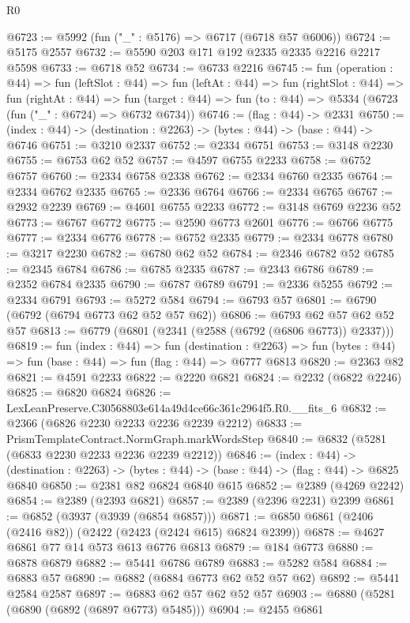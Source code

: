 \begin{lexlean}{R0}
\begin{coremodule}
@6723 := @5992 (fun ("_" : @5176) => @6717 (@6718 @57 @6006))
@6724 := @5175 @2557
@6732 := @5590 @203 @171 @192 @2335 @2335 @2216 @2217 @5598
@6733 := @6718 @52
@6734 := @6733 @2216
@6745 := fun (operation : @44) =>
  fun (leftSlot : @44) =>
  fun (leftAt : @44) =>
  fun (rightSlot : @44) =>
  fun (rightAt : @44) =>
  fun (target : @44) => fun (to : @44) => @5334 (@6723 (fun ("_" : @6724) => @6732 @6734))
@6746 := (flag : @44) -> @2331
@6750 := (index : @44) -> (destination : @2263) -> (bytes : @44) -> (base : @44) -> @6746
@6751 := @3210 @2337
@6752 := @2334 @6751
@6753 := @3148 @2230
@6755 := @6753 @62 @52
@6757 := @4597 @6755 @2233
@6758 := @6752 @6757
@6760 := @2334 @6758 @2338
@6762 := @2334 @6760 @2335
@6764 := @2334 @6762 @2335
@6765 := @2336 @6764
@6766 := @2334 @6765
@6767 := @2932 @2239
@6769 := @4601 @6755 @2233
@6772 := @3148 @6769 @2236 @52
@6773 := @6767 @6772
@6775 := @2590 @6773 @2601
@6776 := @6766 @6775
@6777 := @2334 @6776
@6778 := @6752 @2335
@6779 := @2334 @6778
@6780 := @3217 @2230
@6782 := @6780 @62 @52
@6784 := @2346 @6782 @52
@6785 := @2345 @6784
@6786 := @6785 @2335
@6787 := @2343 @6786
@6789 := @2352 @6784 @2335
@6790 := @6787 @6789
@6791 := @2336 @5255
@6792 := @2334 @6791
@6793 := @5272 @584
@6794 := @6793 @57
@6801 := @6790 (@6792 (@6794 @6773 @62 @52 @57 @62))
@6806 := @6793 @62 @57 @62 @52 @57
@6813 := @6779 (@6801 (@2341 (@2588 (@6792 (@6806 @6773)) @2337)))
@6819 := fun (index : @44) =>
  fun (destination : @2263) =>
  fun (bytes : @44) => fun (base : @44) => fun (flag : @44) => @6777 @6813
@6820 := @2363 @82
@6821 := @4591 @2233
@6822 := @2220 @6821
@6824 := @2232 (@6822 @2246)
@6825 := @6820 @6824
@6826 := LexLeanPreserve.C30568803e614a49d4ce66c361c2964f5.R0.__fits_6
@6832 := @2366 (@6826 @2230 @2233 @2236 @2239 @2212)
@6833 := PrismTemplateContract.NormGraph.markWordsStep
@6840 := @6832 (@5281 (@6833 @2230 @2233 @2236 @2239 @2212))
@6846 := (index : @44) ->
  (destination : @2263) -> (bytes : @44) -> (base : @44) -> (flag : @44) -> @6825 @6840
@6850 := @2381 @82 @6824 @6840 @615
@6852 := @2389 (@4269 @2242)
@6854 := @2389 (@2393 @6821)
@6857 := @2389 (@2396 @2231) @2399
@6861 := @6852 (@3937 (@3939 (@6854 @6857)))
@6871 := @6850 @6861 (@2406 (@2416 @82)) (@2422 (@2423 (@2424 @615) @6824 @2399))
@6878 := @4627 @6861 @77 @14 @573 @613 @6776 @6813
@6879 := @184 @6773
@6880 := @6878 @6879
@6882 := @5441 @6786 @6789
@6883 := @5282 @584
@6884 := @6883 @57
@6890 := @6882 (@6884 @6773 @62 @52 @57 @62)
@6892 := @5441 @2584 @2587
@6897 := @6883 @62 @57 @62 @52 @57
@6903 := @6880 (@5281 (@6890 (@6892 (@6897 @6773) @5485)))
@6904 := @2455 @6861

\end{coremodule}
\end{lexlean}

